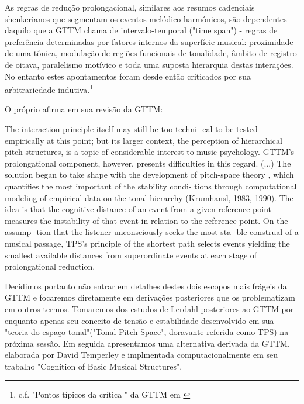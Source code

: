 \documentclass[
	12pt,				%
	openright,			%
	twoside,			%
	a4paper,			%
	english,			%
	french,				%
	spanish,			%
	brazil				%
	]{abntex2}
\begin{document}
As regras de redução prolongacional, similares aos resumos cadenciais shenkerianos que segmentam os eventos melódico-harmônicos, são dependentes daquilo que a GTTM chama de intervalo-temporal ("time span") - regras de preferência determinadas por fatores internos da superfície musical: proximidade de uma tônica, modulação de regiões funcionais de tonalidade, âmbito de registro de oitava, paralelismo motívico e toda uma suposta hierarquia destas interações. No entanto estes apontamentos foram desde então criticados por sua arbitrariedade indutiva.\footnote{ c.f. "Pontos típicos da crítica " da GTTM em \cite[pg. 35]{hansen2011legacy} }

O próprio  afirma em sua revisão da GTTM:

\begin{citacao}
The interaction principle itself may still be too techni-
cal to be tested empirically at this point; but its larger
context, the perception of hierarchical pitch structures,
is a topic of considerable interest to music psychology.
GTTM’s prolongational component, however, presents
difficulties in this regard. (...)
The solution began to take shape with the development
of pitch-space theory \cite{lerdahl1988tps}, which
quantifies the most important of the stability condi-
tions through computational modeling of empirical
data on the tonal hierarchy (Krumhansl, 1983, 1990).
The idea is that the cognitive distance of an event from
a given reference point measures the instability of that
event in relation to the reference point. On the assump-
tion that the listener unconsciously seeks the most sta-
ble construal of a musical passage, TPS’s principle of
the shortest path selects events yielding the smallest
available distances from superordinate events at each
stage of prolongational reduction.
\cite[p. 191]{lerdahl2009genesis}
\end{citacao}

Decidimos portanto não entrar em detalhes destes dois escopos mais frágeis da GTTM e focaremos diretamente em derivações posteriores que os problematizam em outros termos. Tomaremos dos estudos de Lerdahl posteriores ao GTTM  por enquanto apenas seu conceito de tensão e estabilidade desenvolvido em sua "teoria do espaço tonal"("Tonal Pitch Space", doravante referida como TPS) na próxima sessão. Em seguida apresentamos uma alternativa derivada da GTTM, elaborada por David Temperley e implmentada computacionalmente em seu trabalho "Cognition of Basic Musical Structures"\cite{temperley2004cognition}.
\end{document}
